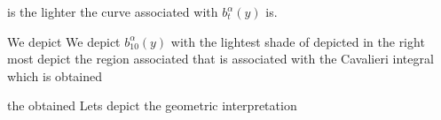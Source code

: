 \documentclass{article}
\theoremstyle{theorem}
\theoremstyle{definition}
\begin{document}
is the lighter the curve associated with $b_t^{\alpha}(y)$ is.

We depict We depict $b_10^{\alpha}(y)$ with the lightest
shade of
depicted in the right most   depict the region associated that is associated with the Cavalieri integral which is obtained 


the obtained Lets depict the geometric interpretation 






\end{document}
